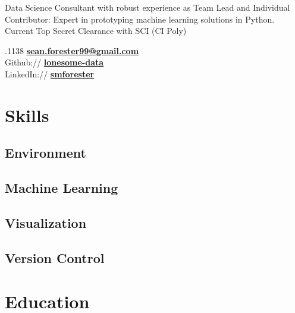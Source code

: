 \documentclass[]{Forester-Resume}
\begin{document}
%
%
\lastupdated

%
%


{ 
Data Science Consultant with robust experience as Team Lead and Individual Contributor: Expert in prototyping  machine learning solutions in Python. Current Top Secret Clearance with SCI (CI Poly) 
}
%
%

\begin{minipage}[t]{0.33\textwidth} 
.1138
\href{mailto:sean.forester99@gmail.com}{\bf sean.forester99@gmail.com}\\
Github:// \href{https://github.com/lonesome-data}{\bf lonesome-data} \\
LinkedIn://  \href{https://www.linkedin.com/in/smforester/}{\bf {smforester}} \\

\section{Skills}
\subsection{Environment}
\subsection{Machine Learning}
\subsection{Visualization}
\subsection{Version Control}

\section{Education} 


\end{minipage}
\end{document}

